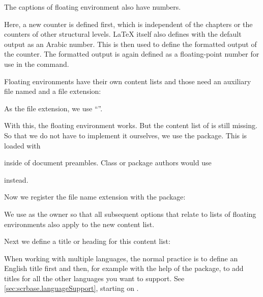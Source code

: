The captions of floating environment also have numbers.
\begin{lstcode}
  \newcommand*{\remarkboxformat}{%
    Remark~\theremarkbox\csname autodot\endcsname}
  \newcommand*{\fnum@remarkbox}{\remarkboxformat}
\end{lstcode}
Here, a new counter is defined first, which is independent of the chapters
or the counters of other structural levels. \LaTeX{} itself also defines
 with the default output as an Arabic number.
This is then used to define the formatted output of the
counter. The formatted output is again defined as a floating-point
number for use in the  command.

Floating environments have their own content lists
and those need an auxiliary file named  and a file 
extension:
\begin{lstcode}
  \newcommand*{\ext@remarkbox}{lor}
\end{lstcode}
As the file extension, we use ``''.

With this, the floating environment works. But the content list of 
is still missing. So that we do not have to implement it ourselves, we
use the  package. This is loaded with
\begin{lstcode}
  \usepackage{tocbasic}
\end{lstcode}
inside of document preambles. Class or package authors would use
\begin{lstcode}
  \RequirePackage{tocbasic}
\end{lstcode}
instead.

Now we register the file name extension with the
 package:
\begin{lstcode}
\end{lstcode}
We use  as the owner so that all subsequent \KOMAScript{}
options that relate to lists of floating environments also apply to the new
content list.

Next we define a title or heading for this content list:
\begin{lstcode}
  \newcommand*{\listoflorname}{List of Remarks}
\end{lstcode}
When working with multiple languages, the normal practice is to define an
English title first and then, for example with the help of the
 package, to add titles for all the other languages you want
to support. See \autoref{sec:scrbase.languageSupport}, starting on
.

